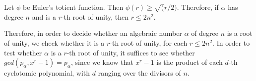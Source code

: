 \begin{lemma}
Let $\phi$ be Euler's totient function. Then $\phi(r)\geq\sqrt(r/2)$. Therefore, if $\alpha$ has degree $n$ and is a $r$-th root of unity, then $r\leq 2n^2$.
\end{lemma}

Therefore, in order to decide whether an algebraic number $\alpha$ of degree $n$ is a root of unity, we check whether it is a $r$-th root of unity, for each $r\leq 2n^2$. In order to test whether $\alpha$ is a $r$-th root of unity, it suffices to see whether $\mathit{gcd}(p_\alpha,x^r-1)=p_\alpha$, since we know that $x^r-1$ is the product of each $d$-th cyclotomic polynomial, with $d$ ranging over the divisors of $n$.

